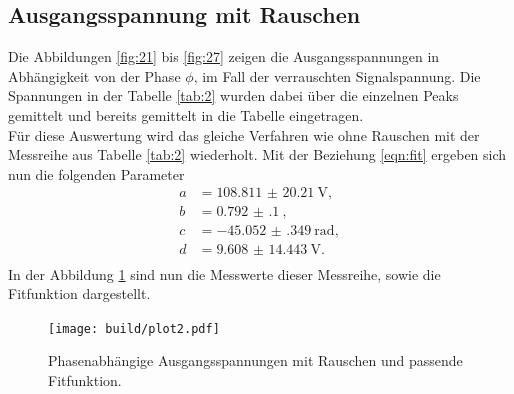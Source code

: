 \subsection{Ausgangsspannung mit Rauschen}
Die Abbildungen \ref{fig:21} bis \ref{fig:27} zeigen die Ausgangsspannungen in Abhängigkeit von der Phase $\phi$, im Fall der verrauschten Signalspannung. Die Spannungen in der Tabelle \ref{tab:2}
wurden dabei über die einzelnen Peaks gemittelt und bereits gemittelt in die Tabelle eingetragen.
\\
\newline 
Für diese Auswertung wird das gleiche Verfahren wie ohne Rauschen mit der Messreihe aus Tabelle \ref{tab:2} wiederholt. Mit der Beziehung \eqref{eqn:fit} ergeben sich nun die folgenden
Parameter
\begin{align*}
    a &= \SI{ 108.811(20210)}{\volt},\\
    b &= \SI{0.792(100)}{},\\
    c &= \SI{-45.052(349)}{\radian},\\
    d &= \SI{9.608(14443)}{\volt}.\\
\end{align*}
In der Abbildung \ref{fig:licht2} sind nun die Messwerte dieser Messreihe, sowie die Fitfunktion dargestellt.
\begin{figure}
    \centering
    \texttt{[image: build/plot2.pdf]}
    \caption{Phasenabhängige Ausgangsspannungen mit Rauschen und passende Fitfunktion.} 
    \label{fig:licht2}
\end{figure}
